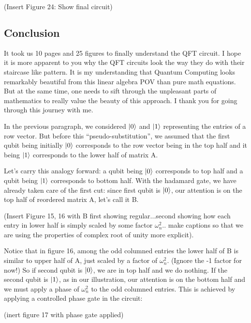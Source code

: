 \documentclass{article}
\newcommand{\om}{\omega_n}
\begin{document}
    (Insert Figure 24: Show final circuit)

    \subsection{Conclusion}
    It took us 10 pages and 25 figures to finally understand the QFT circuit. I
    hope it is more apparent to you why the QFT circuits look the way they do
    with their staircase like pattern. It is my understanding that Quantum
    Computing looks remarkably beautiful from this linear algebra POV than
    pure math equations. But at the same time, one needs to sift through the
    unpleasant parts of mathematics to really value the beauty of this approach.
    I thank you for going through this journey with me.



   \iffalse
     In the previous
    paragraph, we considered \(\ket{0}\) and \(\ket{1}\) representing the entries of a row
    vector. But before this ``pseudo-substitution'', we assumed that the first qubit being
    initially \(\ket{0}\) corresponds to the row vector being in the top half and it being
    \(\ket{1}\) corresponds to the lower half of matrix A.

    Let's carry this analogy forward: a qubit being \(\ket{0}\) corresponds to top half
    and a qubit being \(\ket{1}\) corresponds to bottom half. With the hadamard
    gate, we have already taken care of the first cut: since first qubit is \(\ket{0}\),
    our attention is on the top half of reordered matrix A, let's call it B.

    (Insert Figure 15, 16 with B first showing regular...second showing how
    each entry in lower half is simply scaled by some factor \(\om^{2}\)..
    make captions so that we are using the properties of complex root
    of unity more explicit).

    Notice that in figure 16, among the odd columned entries
    the lower half of B is similar to upper half of A, just scaled by a factor
    of \(\om^{2}\). (Ignore the -1 factor for now!) So if second qubit is
    \(\ket{0}\), we are in top half and we do nothing. If the second qubit is
    \(\ket{1}\), as in our illustration, our attention is on the bottom half and we must apply a phase
    of \(\om^{2}\) to the odd columned entries. This is achieved by applying
    a controlled phase gate in the circuit:

    (inert figure 17 with phase gate applied)
\end{document}
